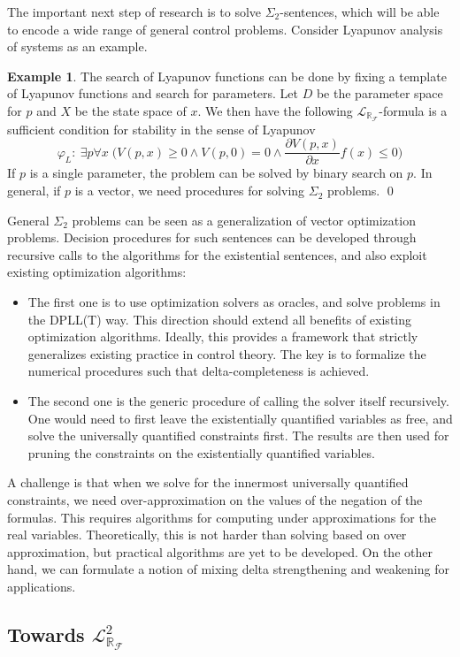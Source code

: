 \documentclass[11pt]{article}
\newcommand{\lrf}{\mathcal{L}_{\mathbb{R}_{\mathcal{F}}}}
\theoremstyle{definition}
\newtheorem{example}{Example}[section]
\begin{document}
The important next step of research is to solve $\Sigma_2$-sentences, which will be able to encode a wide range of general control problems. Consider Lyapunov analysis of systems as an example. 
\begin{example}
The search of Lyapunov functions can be done by fixing a template of Lyapunov functions and search for parameters. 
Let $D$ be the parameter space for $p$ and $X$ be the state space of $x$. We then have the following $\lrf$-formula is a sufficient condition for stability in the sense of Lyapunov
$$\varphi_L:\ \exists p\forall x\; \bigg(V(p,x)\geq 0 \wedge V(p,0) = 0\wedge \frac{\partial V(p,x)}{\partial x}f(x)\leq 0\bigg)$$
If $p$ is a single parameter, the problem can be solved by binary search on $p$. In general, if $p$ is a vector, we need procedures for solving $\Sigma_2$ problems. \qed
\end{example}
General $\Sigma_2$ problems can be seen as a generalization of vector optimization problems.  Decision procedures for such sentences can be developed through recursive calls to the algorithms for the existential sentences, and also exploit existing optimization algorithms:
\begin{itemize}
\item The first one is to use optimization solvers as oracles, and solve problems in the DPLL(T) way. This direction should extend all benefits of existing optimization algorithms. Ideally, this provides a framework that strictly generalizes existing practice in control theory. The key is to formalize the numerical procedures such that delta-completeness is achieved. 
\item The second one is the generic procedure of calling the solver itself recursively. One would need to first leave the existentially quantified variables as free, and solve the universally quantified constraints first. The results are then used for pruning the constraints on the existentially quantified variables. 
\end{itemize}
A challenge is that when we solve for the innermost universally quantified constraints, we need over-approximation on the values of the negation of the formulas. This requires algorithms for computing under approximations for the real variables. Theoretically, this is not harder than solving based on over approximation, but practical algorithms are yet to be developed. On the other hand, we can formulate a notion of mixing delta strengthening and weakening for applications.

\subsection{Towards $\lrf^2$} 
\end{document}
